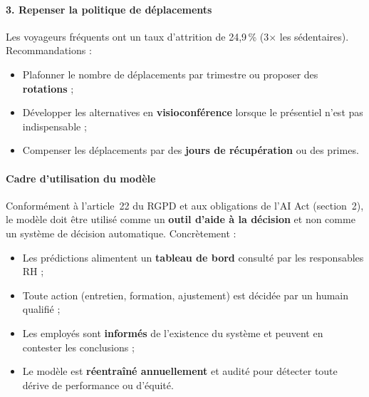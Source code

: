 \paragraph{3. Repenser la politique de déplacements}
Les voyageurs fréquents ont un taux d'attrition de 24,9\,\% (3$\times$ les sédentaires). Recommandations :
\begin{itemize}
    \item Plafonner le nombre de déplacements par trimestre ou proposer des \textbf{rotations} ;
    \item Développer les alternatives en \textbf{visioconférence} lorsque le présentiel n'est pas indispensable ;
    \item Compenser les déplacements par des \textbf{jours de récupération} ou des primes.
\end{itemize}

\paragraph{Cadre d'utilisation du modèle}
Conformément à l'article~22 du RGPD et aux obligations de l'AI Act (section~2), le modèle doit être utilisé comme un \textbf{outil d'aide à la décision} et non comme un système de décision automatique. Concrètement :
\begin{itemize}
    \item Les prédictions alimentent un \textbf{tableau de bord} consulté par les responsables RH ;
    \item Toute action (entretien, formation, ajustement) est décidée par un humain qualifié ;
    \item Les employés sont \textbf{informés} de l'existence du système et peuvent en contester les conclusions ;
    \item Le modèle est \textbf{réentraîné annuellement} et audité pour détecter toute dérive de performance ou d'équité.
\end{itemize}
